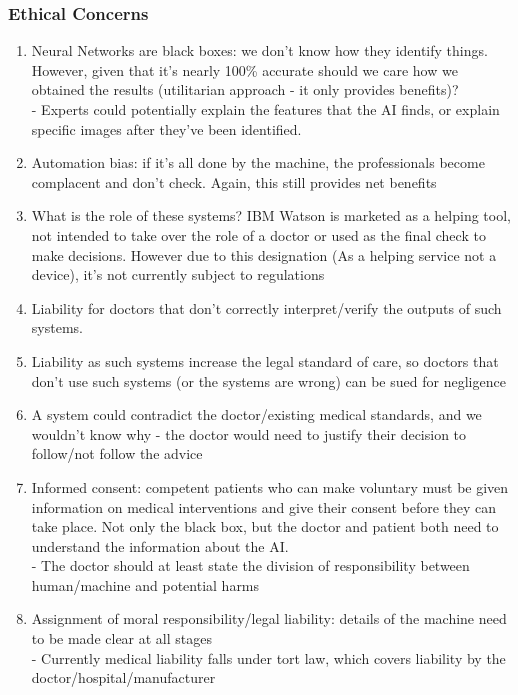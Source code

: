 \subsubsection{Ethical Concerns}
\begin{enumerate}
    \item Neural Networks are black boxes: we don't know how they identify things. However, given that it's nearly 100\% accurate should we care how we obtained the results (utilitarian approach - it only provides benefits)? \\
    \qquad - Experts could potentially explain the features that the AI finds, or explain specific images after they've been identified.
    \item Automation bias: if it's all done by the machine, the professionals become complacent and don't check. Again, this still provides net benefits
    
    \item What is the role of these systems? IBM Watson is marketed as a helping tool, not intended to take over the role of a doctor or used as the final check to make decisions. However due to this designation (As a helping service not a device), it's not currently subject to regulations
    \item Liability for doctors that don't correctly interpret/verify the outputs of such systems. 
    \item Liability as such systems increase the legal standard of care, so doctors that don't use such systems (or the systems are wrong) can be sued for negligence
    \item A system could contradict the doctor/existing medical standards, and we wouldn't know why - the doctor would need to justify their decision to follow/not follow the advice
    
    \item Informed consent: competent patients who can make voluntary must be given information on medical interventions and give their consent before they can take place. Not only the black box, but the doctor and patient both need to understand the information about the AI.\\
    \qquad - The doctor should at least state the division of responsibility between human/machine and potential harms
    \item Assignment of moral responsibility/legal liability: details of the machine need to be made clear at all stages  \\
    \qquad - Currently medical liability falls under tort law, which covers liability by the doctor/hospital/manufacturer
\end{enumerate}

